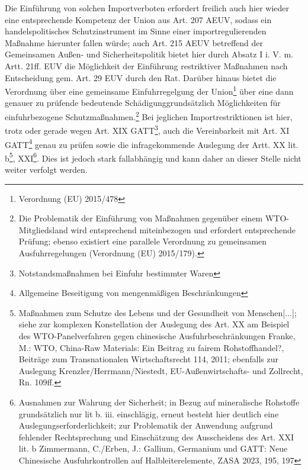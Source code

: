 \documentclass[12pt,a4paper,oneside]{book} %
\begin{document}
{	Die Einführung von solchen Importverboten erfordert freilich auch hier wieder eine entsprechende Kompetenz der Union aus Art. 207 AEUV, sodass ein handelspolitisches Schutzinstrument im Sinne einer importregulierenden Maßnahme hierunter fallen würde; auch Art. 215 AEUV betreffend der Gemeinsamen Außen- und Sicherheitspolitik bietet hier durch Absatz I i. V. m. Artt. 21ff. EUV die Möglichkeit der Einführung restriktiver Maßnahmen nach Entscheidung gem. Art. 29 EUV durch den Rat. Darüber hinaus bietet die Verordnung über eine gemeinsame Einfuhrregelgung der Union\footnote{Verordnung (EU) 2015/478} über eine dann genauer zu prüfende \glqq bedeutende Schädigung\grqq grundsätzlich Möglichkeiten für einfuhrbezogene Schutzmaßnahmen.\footnote{Die Problematik der Einführung von Maßnahmen gegenüber einem WTO-Mitgliedsland wird entsprechend miteinbezogen und erfordert entsprechende Prüfung; ebenso existiert eine parallele Verordnung zu gemeinsamen Ausfuhrregelungen (Verordnung (EU) 2015/179).} Bei jeglichen Importrestriktionen ist hier, trotz oder gerade wegen Art. XIX GATT\footnote{Notstandsmaßnahmen bei Einfuhr bestimmter Waren}, auch die Vereinbarkeit mit Art. XI GATT\footnote{Allgemeine Beseitigung von mengenmäßigen Beschränkungen} genau zu prüfen sowie die infragekommende Auslegung der Artt. XX lit. b\footnote{Maßnahmen zum Schutze des Lebens und der Gesundheit von Menschen[...]; siehe zur komplexen Konstellation der Auslegung des Art. XX am Beispiel des WTO-Panelverfahren gegen chinesische Ausfuhrbeschränkungen Franke, M.: WTO, China-Raw Materials: Ein Beitrag zu fairem Rohstoffhandel?, Beiträge zum Transnationalen Wirtschaftsrecht 114, 2011; ebenfalls zur Auslegung Krenzler/Herrmann/Niestedt, EU-Außenwirtschafts- und Zollrecht, Rn. 109ff.}, XXI\footnote{Ausnahmen zur Wahrung der Sicherheit; in Bezug auf mineralische Rohstoffe grundsätzlich nur lit b. iii. einschlägig, erneut besteht hier deutlich eine Auslegungserforderlichkeit; zur Problematik der Anwendung aufgrund fehlender Rechtsprechung und Einschätzung des Ausscheidens des Art. XXI lit. b Zimmermann, C./Erben, J.: Gallium, Germanium und GATT: Neue Chinesische Ausfuhrkontrollen auf Halbleiterelemente, ZASA 2023, 195, 197}. Dies ist jedoch stark fallabhängig und kann daher an dieser Stelle nicht weiter verfolgt werden.
	
}
\end{document}
